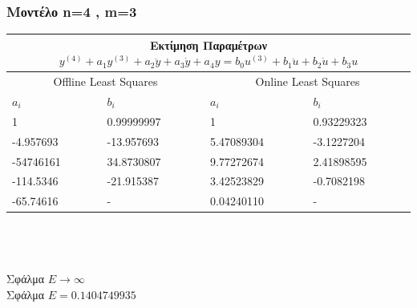 \documentclass[12pt]{article}
\begin{document}
\subsubsection{Μοντέλο n=4 , m=3}
\begin{tabular}{ |p{2.5cm}|p{2.5cm}||p{2.5cm}|p{2.5cm}| }
\hline
\multicolumn{4}{|c|}{ Εκτίμηση Παραμέτρων $y^{(4)}+a_1y^{(3)}+a_2\ddot{y}+a_3\dot{y}+a_4 y= b_{0}u^{(3)} +b_{1}\ddot{u}+b_{2}\dot{u}+b_{3}u$}\\
\hline
\multicolumn{2}{|c||}{Offline Least Squares}&
\multicolumn{2}{|c|}{Online Least Squares }
\\
\hline
$ a_{i}$ & $b_i$ &$ a_{i}$ & $b_i$  \\
\hline
 1         & 0.99999997   &     1       & 0.93229323 \\
-4.957693  & -13.957693   & 5.47089304  & -3.1227204 \\
-54746161  & 34.8730807   & 9.77272674  & 2.41898595 \\
-114.5346  & -21.915387   & 3.42523829  & -0.7082198 \\
-65.74616  & -            & 0.04240110  & - \\
\hline
\end{tabular}
\\ \\ \\
Σφάλμα $E \to \infty$\\
Σφάλμα $E=0.1404749935$
\end{document}
